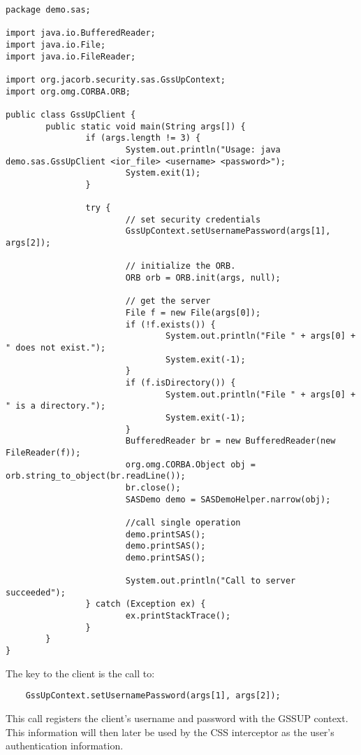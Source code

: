 \begin{scriptsize}
\begin{verbatim}
package demo.sas;

import java.io.BufferedReader;
import java.io.File;
import java.io.FileReader;

import org.jacorb.security.sas.GssUpContext;
import org.omg.CORBA.ORB;

public class GssUpClient {
        public static void main(String args[]) {
                if (args.length != 3) {
                        System.out.println("Usage: java demo.sas.GssUpClient <ior_file> <username> <password>");
                        System.exit(1);
                }

                try {
                        // set security credentials
                        GssUpContext.setUsernamePassword(args[1], args[2]);

                        // initialize the ORB.
                        ORB orb = ORB.init(args, null);

                        // get the server
                        File f = new File(args[0]);
                        if (!f.exists()) {
                                System.out.println("File " + args[0] + " does not exist.");
                                System.exit(-1);
                        }
                        if (f.isDirectory()) {
                                System.out.println("File " + args[0] + " is a directory.");
                                System.exit(-1);
                        }
                        BufferedReader br = new BufferedReader(new FileReader(f));
                        org.omg.CORBA.Object obj = orb.string_to_object(br.readLine());
                        br.close();
                        SASDemo demo = SASDemoHelper.narrow(obj);

                        //call single operation
                        demo.printSAS();
                        demo.printSAS();
                        demo.printSAS();

                        System.out.println("Call to server succeeded");
                } catch (Exception ex) {
                        ex.printStackTrace();
                }
        }
}
\end{verbatim}
\end{scriptsize}

The key to the client is the call to:
\begin{scriptsize}
\begin{verbatim}
    GssUpContext.setUsernamePassword(args[1], args[2]);
\end{verbatim}
\end{scriptsize}
This call registers the client's username and password with the GSSUP context.
This information will then later be used by the CSS interceptor as the user's
authentication information.

